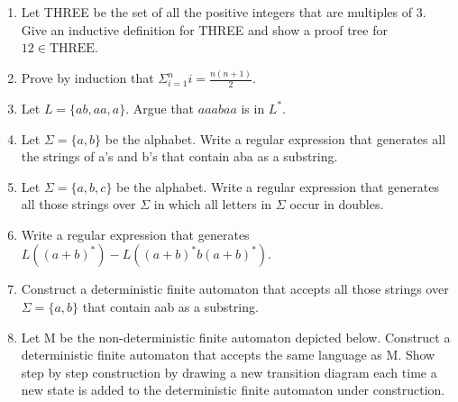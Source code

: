 \documentclass{article}
\begin{document}
\begin{enumerate}
\item Let THREE be the set of all the positive integers that are multiples of 3. Give an
  inductive definition for THREE and show a proof tree for $12\in \mbox{THREE}$.

\pagebreak

\item Prove by induction that $\Sigma_{i=1}^n i = \frac{n(n+1)}{2}$.

\pagebreak



\item Let $L=\{ab,aa,a\}$. Argue that $aaabaa$ is in $L^*$.
\vspace{15pc}


\item Let $\Sigma=\{a,b\}$ be the alphabet. Write a regular
expression that generates all the strings of a's and b's
that contain aba as a substring. \pagebreak


\item Let $\Sigma=\{a,b,c\}$ be the alphabet. Write a regular
expression that generates all those strings over $\Sigma$ in which
all letters in $\Sigma$ occur in doubles.

\vspace{10pc}

\item Write a regular expression that generates $L((a+b)^*) -
L((a+b)^*b(a+b)^*)$. \vspace{10pc}

\item Construct a deterministic finite automaton that accepts all those strings
over $\Sigma=\{a,b\}$ that contain aab as a substring.

\pagebreak

 \item Let M be the non-deterministic finite automaton depicted below.
  Construct a deterministic finite automaton that accepts the same language as M. Show step by step construction by drawing a new transition diagram each time a new state  is added to the deterministic finite automaton under construction.


\end{enumerate}
\end{document}
